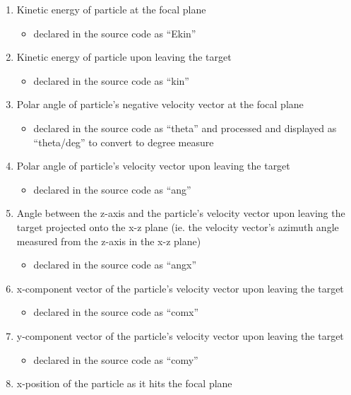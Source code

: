 \documentclass{article}
\begin{document}
\begin{enumerate}
	\item Kinetic energy of particle at the focal plane
	\begin{itemize}
		\item declared in the source code as ``Ekin''
	\end{itemize}
	\item Kinetic energy of particle upon leaving the target
	\begin{itemize}
		\item declared in the source code as ``kin''
	\end{itemize}
	\item Polar angle of particle's negative velocity vector at the focal plane
	\begin{itemize}
		\item declared in the source code as ``theta'' and processed and 		displayed as ``theta/deg'' to convert to degree measure
	\end{itemize}
	\item Polar angle of particle's velocity vector upon leaving the target
	\begin{itemize}
		\item declared in the source code as ``ang''
	\end{itemize}
	\item Angle between the z-axis and the particle's velocity vector upon leaving the target projected onto the x-z plane (ie. the velocity vector's azimuth angle measured from the z-axis in the x-z plane)
	\begin{itemize}
		\item declared in the source code as ``angx''
	\end{itemize}
	\item x-component vector of the particle's velocity vector upon leaving the target
	\begin{itemize}
		\item declared in the source code as ``comx''
	\end{itemize}
	\item y-component vector of the particle's velocity vector upon leaving the target
	\begin{itemize}
		\item declared in the source code as ``comy''
	\end{itemize}
	\item x-position of the particle as it hits the focal plane
	\begin{itemize}

\end{itemize}
\end{enumerate}
\end{document}
